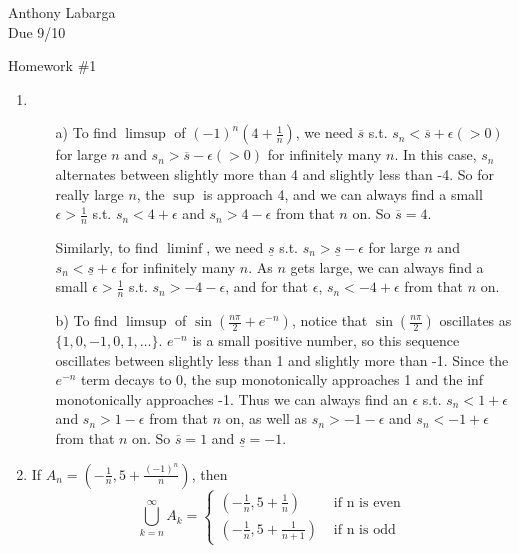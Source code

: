 \documentclass[12pt]{article}
\begin{document}
\begin{flushright}

Anthony Labarga\\
Due 9/10
\end{flushright}

\begin{center}
Homework \#1
\end{center}

\begin{enumerate}

\item

\begin{itemize}

\item[a)] To find $\limsup$ of $(-1)^n(4+\frac{1}{n})$, we need $\overline{s}$ s.t. $s_n<\overline{s}+\epsilon(>0)$ for large $n$ and $s_n>\overline{s}-\epsilon(>0)$ for infinitely many $n$. In this case, $s_n$ alternates between slightly more than 4 and slightly less than -4. So for really large $n$, the $\sup$ is approach 4, and we can always find a small $\epsilon > \frac{1}{n}$ s.t. $s_n<4+\epsilon$ and $s_n>4-\epsilon$ from that $n$ on. So $\overline{s}=4$.

Similarly, to find $\liminf$, we need $\underline{s}$ s.t. $s_n>\underline{s}-\epsilon$ for large $n$ and $s_n<\underline{s}+\epsilon$ for infinitely many $n$. As $n$ gets large, we can always find a small $\epsilon > \frac{1}{n}$ s.t. $s_n>-4-\epsilon$, and for that $\epsilon$, $s_n<-4+\epsilon$ from that $n$ on. 

\item[b)] To find $\limsup$ of $\sin(\frac{n\pi}{2}+e^{-n})$, notice that $\sin(\frac{n\pi}{2})$ oscillates as $\{1,0,-1,0,1,\dots\}$. $e^{-n}$ is a small positive number, so this sequence oscillates between slightly less than 1 and slightly more than -1. Since the $e^{-n}$ term decays to 0, the sup monotonically approaches 1 and the inf monotonically approaches -1. Thus we can always find an $\epsilon$ s.t. $s_n<1+\epsilon$ and $s_n>1-\epsilon$ from that $n$ on, as well as $s_n>-1-\epsilon$ and $s_n<-1+\epsilon$ from that $n$ on. So $\overline{s}=1$ and $\underline{s}=-1$.

\end{itemize}

\item If $A_n= \left( -\frac{1}{n},5+\frac{(-1)^n}{n} \right)$, then 
$$\bigcup^\infty_{k=n} A_k = \begin{cases} \left( -\frac{1}{n},5+\frac{1}{n} \right) & \mbox{ if n is even}\\ \left( -\frac{1}{n},5+\frac{1}{n+1} \right) & \mbox{ if n is odd} \end{cases}$$


\end{enumerate}
\end{document}
